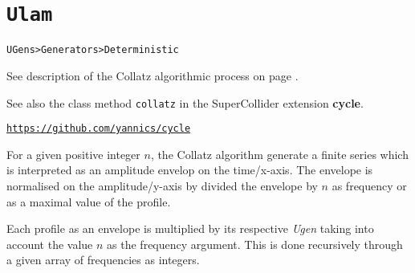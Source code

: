 
\section{\texttt{Ulam}}
\label{colz}

\texttt{UGens>Generators>Deterministic}

\bigskip

%
%
%
%
%
%
%

See description of the Collatz algorithmic process on page \pageref{colres}. 

See also the class method \texttt{collatz} in the SuperCollider extension \textbf{cycle}. %

\href{https://github.com/yannics/cl-mst}{\texttt{\small https://github.com/yannics/cycle}}

\bigskip
For a given positive integer $n$, the Collatz algorithm generate a finite series which is interpreted as an amplitude envelop on the time/x-axis. The envelope is normalised on the amplitude/y-axis by divided the envelope by $n$ as frequency or as a maximal value of the profile. 

\bigskip

Each profile as an envelope is multiplied by its respective \textit{Ugen} taking into account the value $n$ as the frequency argument. This is done recursively through a given array of frequencies as integers.



